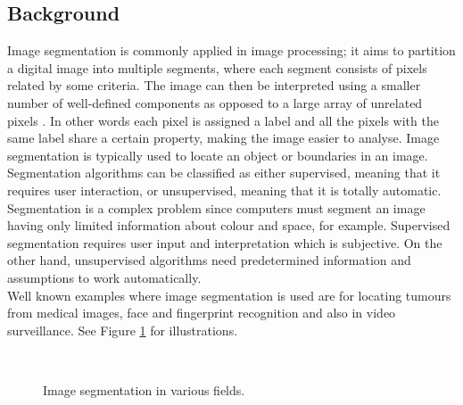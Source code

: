 \documentclass[a4paper,10pt]{article}
\begin{document}
\subsection{Background}
Image segmentation is commonly applied in image processing; it
aims to partition a digital image into multiple segments, where each
  segment consists of pixels related by some criteria.
The image can then be interpreted using a smaller number of
well-defined components as opposed to a large array of unrelated pixels \cite{segmentation}.  
In other words each pixel is assigned a label and all the pixels with the same
label share a certain
property, making the image easier to analyse. Image segmentation is
typically used to locate an object or boundaries in an image. \\

Segmentation algorithms can be classified as either supervised, meaning that
it requires user interaction, or unsupervised, meaning that it is totally
automatic.  Segmentation is a complex problem since computers must segment
an
image having only limited information about colour and space, for
example.
Supervised segmentation requires user input and interpretation which is subjective.  
On the other hand,
unsupervised algorithms need predetermined information and assumptions to work
automatically. \\

Well known examples where image segmentation is used are
for locating tumours from medical images, face and
fingerprint recognition and also in video surveillance.  See Figure \ref{examples} for illustrations.

\begin{figure}[H]
\centering
\mbox{ \quad
{}}
\caption{Image segmentation in various fields.}
\label{examples}
\end{figure}
\end{document}
